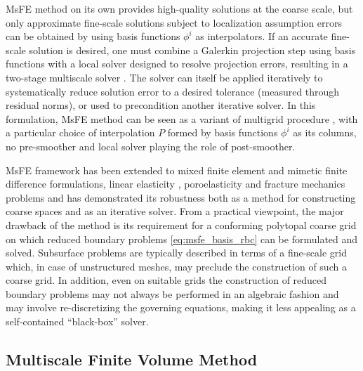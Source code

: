 MsFE method on its own provides high-quality solutions at the coarse scale, but only approximate fine-scale solutions subject to localization assumption errors can be obtained by using basis functions $\phi^i$ as interpolators.   If an accurate fine-scale solution is desired, one must combine a Galerkin projection step using basis functions with a local solver designed to resolve projection errors, resulting in a two-stage multiscale solver \cite{Zhou2012}.   The solver can itself be applied iteratively to systematically reduce solution error to a desired tolerance (measured through residual norms), or used to precondition another iterative solver.   In this formulation, MsFE method can be seen as a variant of multigrid procedure , with a particular choice of interpolation $P$ formed by basis functions $\phi^i$ as its columns, no pre-smoother and local solver playing the role of post-smoother.

MsFE framework has been extended to mixed finite element \cite{Chen2002} and mimetic finite difference \cite{Lipnikov2008} formulations, linear elasticity \cite{Buck2013,Castelletto2017}, poroelasticity \cite{Brown2016,Castelletto2019} and fracture mechanics \cite{Levonyan2019} problems and has demonstrated its robustness both as a method for constructing coarse spaces and as an iterative solver.   From a practical viewpoint, the major drawback of the method is its requirement for a conforming polytopal coarse grid on which reduced boundary problems \cref{eq:msfe_basis_rbc} can be formulated and solved.   Subsurface problems are typically described in terms of a fine-scale grid which, in case of unstructured meshes, may preclude the construction of such a coarse grid.   In addition, even on suitable grids the construction of reduced boundary problems may not always be performed in an algebraic fashion and may involve re-discretizing the governing equations, making it less appealing as a self-contained ``black-box'' solver.

\subsection{Multiscale Finite Volume Method}
\label{subsec:related_work_msfv}

